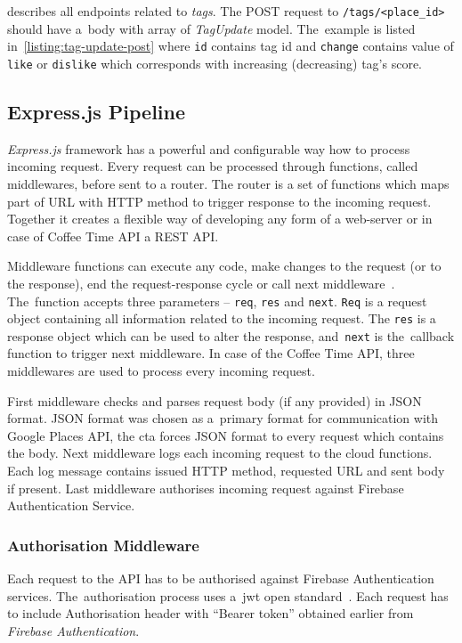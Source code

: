  describes all endpoints related to \textit{tags}. The POST request to \verb|/tags/<place_id>| should have a~body with array of \textit{TagUpdate} model. The~example is listed in~\cref{listing:tag-update-post} where \verb|id| contains tag id and \verb|change| contains value of \verb|like| or \verb|dislike| which corresponds with increasing (decreasing) tag's score. 
\subsection{Express.js Pipeline}
\textit{Express.js} framework has a powerful and configurable way how to process incoming request. Every request can be processed through functions, called middlewares, before sent to a router. The router is a set of functions which maps part of URL with HTTP method to trigger response to the incoming request. Together it creates a flexible way of developing any form of a web-server or in case of Coffee Time API a REST API. 

Middleware functions can execute any code, make changes to the request (or to the response), end the request-response cycle or call next middleware~\cite{express-js-middleware}. The~function accepts three parameters -- \verb|req|, \verb|res| and \verb|next|. \verb|Req| is a request object containing all information related to the incoming request. The \verb|res| is a response object which can be used to alter the response, and~\verb|next| is the~callback function to trigger next middleware. In case of the Coffee Time API, three middlewares are used to process every incoming request.

First middleware checks and parses request body (if any provided) in JSON format. JSON format was chosen as a~primary format for communication with Google Places API, the \gls{cta} forces JSON format to every request which contains the body. Next middleware logs each incoming request to the cloud functions. Each log message contains issued HTTP method, requested URL and sent body if present. Last middleware authorises incoming request against Firebase Authentication Service.

\subsubsection{Authorisation Middleware}
Each request to the API has to be authorised against Firebase Authentication services. The~authorisation process uses a~\gls{jwt} open standard~\cite{jwt-intro}. Each request has to include Authorisation header with ``Bearer token'' obtained earlier from \textit{Firebase Authentication}. 

